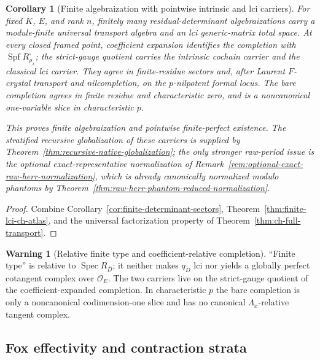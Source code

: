 \documentclass[11pt]{article}
\newtheorem{corollary}[theorem]{Corollary}
\theoremstyle{definition}
\newtheorem{warning}[theorem]{Warning}
\begin{document}
\begin{corollary}[Finite algebraization with pointwise intrinsic and lci carriers]\label{cor:lci-atlas-existence}
For fixed $K$, $E$, and rank $n$, finitely many residual-determinant algebraizations carry a module-finite universal transport algebra and an lci generic-matrix total space.  At every closed framed point, coefficient expansion identifies the completion with $\operatorname{Spf}R_{\rho_x}^{\square}$; the strict-gauge quotient carries the intrinsic cochain carrier and the classical lci carrier.  They agree in finite-residue sectors and, after Laurent $F$-crystal transport and nilcompletion, on the $p$-nilpotent formal locus.  The bare completion agrees in finite residue and characteristic zero, and is a noncanonical one-variable slice in characteristic $p$.

This proves finite algebraization and pointwise finite-perfect existence.  The stratified recursive globalization of these carriers is supplied by Theorem~\ref{thm:recursive-native-globalization}; the only stronger raw-period issue is the optional exact-representative normalization of Remark~\ref{rem:optional-exact-raw-herr-normalization}, which is already canonically normalized modulo phantoms by Theorem~\ref{thm:raw-herr-phantom-reduced-normalization}.
\end{corollary}

\begin{proof}
Combine Corollary~\ref{cor:finite-determinant-sectors}, Theorem~\ref{thm:finite-lci-ch-atlas}, and the universal factorization property of Theorem~\ref{thm:ch-full-transport}.
\end{proof}

\begin{warning}[Relative finite type and coefficient-relative completion]\label{warn:relative-finite-type-charp-slice}
``Finite type'' is relative to $\operatorname{Spec}R_{\bar D}$; it neither makes $q_{\bar D}$ lci nor yields a globally perfect cotangent complex over $\mathcal O_E$.  The two carriers live on the strict-gauge quotient of the coefficient-expanded completion.  In characteristic $p$ the bare completion is only a noncanonical codimension-one slice and has no canonical $\Lambda_x$-relative tangent complex.
\end{warning}

\subsection{Fox effectivity and contraction strata}\label{subsec:fox-effectivity}
\end{document}
